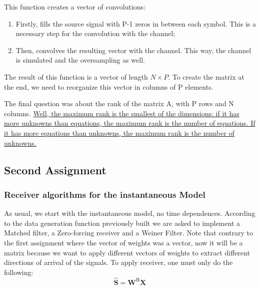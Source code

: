 \documentclass[12pt, a4paper]{article}
\begin{document}

This function creates a vector of convolutions: 
\begin{enumerate}
    \item Firstly, fills the source signal with P-1 zeros in between each symbol. This is a necessary step for the convolution with the channel;
    \item Then, convolves the resulting vector with the channel. This way, the channel is simulated and the oversampling as well.
\end{enumerate}

The result of this function is a vector of length $N\times P$. 
To create the matrix at the end, we need to reorganize this vector in columns of P elements.

\vspace{.5cm}

\par The final question was about the rank of the matrix A, with P rows and N columns. \uline{Well, the maximum rank is the smallest of the dimensions: if it has more unknowns than equations, the maximum rank is the number of equations. If it has more equations than unknowns, the maximum rank is the number of unknowns.}




\subsection{Second Assignment}

\subsubsection{Receiver algorithms for the instantaneous Model}

As usual, we start with the instantaneous model, no time dependences. 
According to the data generation function previously built we are asked to implement a Matched filter, a Zero-forcing receiver and a Weiner Filter.
Note that contrary to the first assignment where the vector of weights was a vector, now it will be a matrix because we want to apply different vectors of weights to extract different directions of arrival of the signals. To apply receiver, one must only do the following:
\begin{equation}
    \mathbf{\hat{S}} = \mathbf{W}^\text{H} \mathbf{X}
\end{equation}
\end{document}

